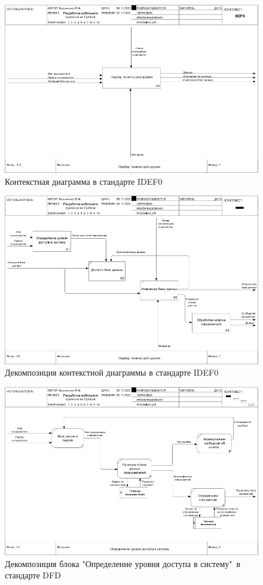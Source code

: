 \documentclass[14pt]{extreport}
\begin{document}
\begin{landscape}
\begin{figure}[H]
\centerline{\includegraphics[width=0.9\linewidth]{01_A-0}}
\caption{Контекстная диаграмма в стандарте IDEF0}
\label{fig1}
\end{figure}

\begin{figure}[H]
\centerline{\includegraphics[width=0.9\linewidth]{02_A0}}
\caption{Декомпозиция контекстной диаграммы в стандарте IDEF0}
\label{fig2}
\end{figure}

\begin{figure}[H]
\centerline{\includegraphics[width=0.9\linewidth]{03_A1}}
\caption{Декомпозиция блока "Определение уровня доступа в систему"\ в стандарте DFD}
\label{fig3}
\end{figure}


\end{landscape}
\end{document}
